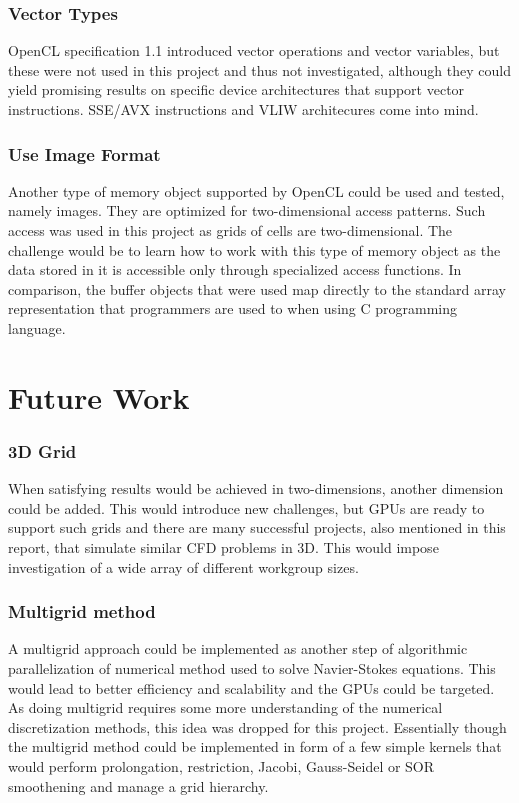 \subsubsection{Vector Types}
OpenCL specification 1.1 introduced vector operations and vector variables, but these were not used in this project and thus not investigated, although they could yield promising results on specific device architectures that support vector instructions. SSE/AVX instructions and VLIW architecures come into mind. 


\subsubsection{Use Image Format}
Another type of memory object supported by OpenCL could be used and tested, namely images. They are optimized for two-dimensional access patterns. Such access was used in this project as grids of cells are two-dimensional. The challenge would be to learn how to work with this type of memory object as the data stored in it is accessible only through specialized access functions. In comparison, the buffer objects that were used map directly to the standard array representation that programmers are used to when using C programming language.

\section{Future Work}

\subsubsection{3D Grid}
When satisfying results would be achieved in two-dimensions, another dimension could be added. This would introduce new challenges, but GPUs are ready to support such grids and there are many successful projects, also mentioned in this report, that simulate similar CFD problems in 3D. This would impose investigation of a wide array of different workgroup sizes.

\subsubsection{Multigrid method}
A multigrid approach could be implemented as another step of algorithmic parallelization of numerical method used to solve Navier-Stokes equations. This would lead to better efficiency and scalability and the GPUs could be targeted. As doing multigrid requires some more understanding of the numerical discretization methods, this idea was dropped for this project. Essentially though the multigrid method could be implemented in form of a few simple kernels that would perform prolongation, restriction, Jacobi, Gauss-Seidel or SOR smoothening and manage a grid hierarchy.

